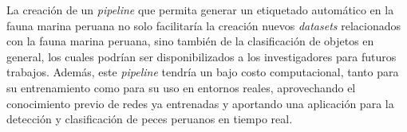 La creación de un \textit{pipeline} que permita generar un etiquetado 
automático en la fauna marina peruana no solo facilitaría la creación 
nuevos \textit{datasets} relacionados con la fauna marina peruana, sino 
también de la clasificación de objetos en general, los cuales 
podrían ser disponibilizados a los investigadores para futuros trabajos. 
Además, este \textit{pipeline} tendría un bajo costo computacional, tanto 
para su entrenamiento como para su uso en entornos reales, aprovechando el 
conocimiento previo de redes ya entrenadas y aportando una aplicación para la 
detección y clasificación de peces peruanos en tiempo real.